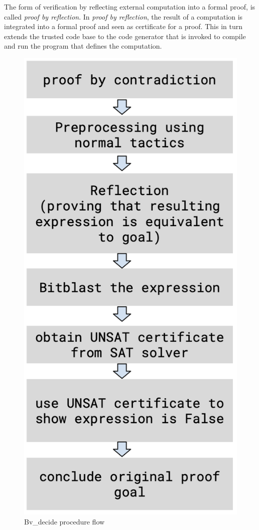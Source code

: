  The form of verification by reflecting external computation into a formal proof, is called \textit{proof by reflection}. In \textit{proof by reflection}, the result of a computation is integrated into a formal proof and seen as certificate for a proof. This in turn extends the trusted code base to the code generator that is invoked to compile and run the program that defines the computation.
\begin{figure}[htbp]
  \centering
  \includegraphics[scale=0.37]{thesis/bv_decide.png}
 
  \caption{Bv\_decide procedure flow}
  \label{fig:your-label}
\end{figure}

